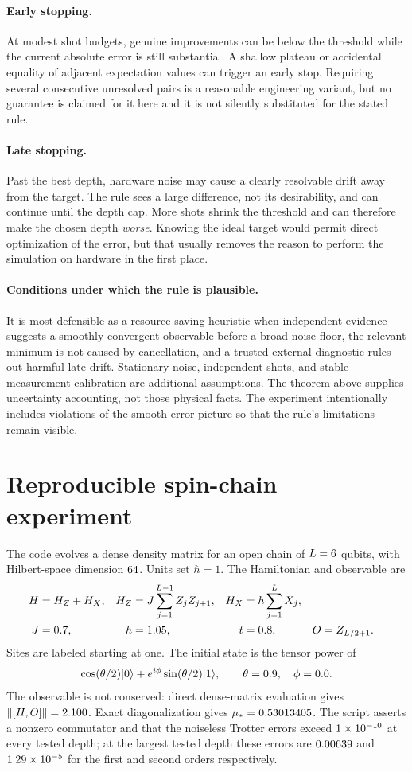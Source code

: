 \documentclass{article}
\DeclarePairedDelimiter{\norm}{\lVert}{\rVert}
\begin{document}
\paragraph{Early stopping.}
At modest shot budgets, genuine improvements can be below the threshold while the current absolute error is still substantial. A shallow plateau or accidental equality of adjacent expectation values can trigger an early stop. Requiring several consecutive unresolved pairs is a reasonable engineering variant, but no guarantee is claimed for it here and it is not silently substituted for the stated rule.

\paragraph{Late stopping.}
Past the best depth, hardware noise may cause a clearly resolvable drift away from the target. The rule sees a large difference, not its desirability, and can continue until the depth cap. More shots shrink the threshold and can therefore make the chosen depth \emph{worse}. Knowing the ideal target would permit direct optimization of the error, but that usually removes the reason to perform the simulation on hardware in the first place.

\paragraph{Conditions under which the rule is plausible.}
It is most defensible as a resource-saving heuristic when independent evidence suggests a smoothly convergent observable before a broad noise floor, the relevant minimum is not caused by cancellation, and a trusted external diagnostic rules out harmful late drift. Stationary noise, independent shots, and stable measurement calibration are additional assumptions. The theorem above supplies uncertainty accounting, not those physical facts. The experiment intentionally includes violations of the smooth-error picture so that the rule's limitations remain visible.

\section{Reproducible spin-chain experiment}
The code evolves a dense density matrix for an open chain of $L=6$ qubits, with Hilbert-space dimension $64$. Units set $\hbar=1$. The Hamiltonian and observable are
\begin{align*}
 H&=H_Z+H_X,
 &H_Z&=J\sum_{j=1}^{L-1}Z_jZ_{j+1},
 &H_X&=h\sum_{j=1}^{L}X_j,\\
 J&=0.7,& h&=1.05,&t&=0.8,&O&=Z_{L/2+1}.
\end{align*}
Sites are labeled starting at one. The initial state is the tensor power of
\[
 \cos(\theta/2)|0\rangle+
 e^{i\phi}\sin(\theta/2)|1\rangle,
 \qquad \theta=0.9,\quad\phi=0.0.
\]
The observable is not conserved: direct dense-matrix evaluation gives
$\norm{[H,O]}=\CommVal$. Exact diagonalization gives $\mu_*=0.53013405$. The script asserts a nonzero commutator and that the noiseless Trotter errors exceed $1\times 10^{-10}$ at every tested depth; at the largest tested depth these errors are $0.00639$ and $1.29\times 10^{-5}$ for the first and second orders respectively.
\end{document}
